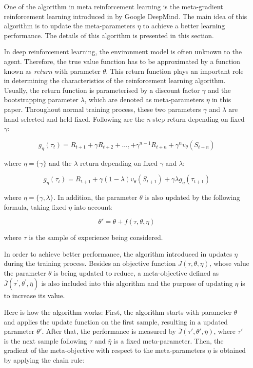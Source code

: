 One of the algorithm in meta reinforcement learning is the meta-gradient reinforcement learning introduced in \cite{meta-gradient} by Google DeepMind. The main idea of this algorithm is to update the meta-parameters $\eta$ to achieve a better learning performance. The details of this algorithm is presented in this section.

\par
In deep reinforcement learning, the environment model is often unknown to the agent. Therefore, the true value function has to be approximated by a function known as \textit{return} with parameter $\theta$. This return function plays an important role in determining the characteristics of the reinforcement learning algorithm. Usually, the return function is parameterised by a discount factor $\gamma$ and the bootstrapping parameter $\lambda$, which are denoted as meta-parameters $\eta$ in this paper. Throughout normal training process, these two parameters $\gamma$ and $\lambda$ are hand-selected and held fixed. Following are the \textit{n}-step return\cite{n-step-return} depending on fixed $\gamma$:

\[g_{\eta}\left(\tau_{t}\right)=R_{t+1}+\gamma R_{t+2}+\ldots,+\gamma^{n-1} R_{t+n}+\gamma^{n} v_{\theta}\left(S_{t+n}\right)\]

where $\eta = \{\gamma\}$ and the $\lambda$ return\cite{lambda-return} depending on fixed $\gamma$ and $\lambda$:

\[g_{\eta}\left(\tau_{t}\right)=R_{t+1}+\gamma(1-\lambda) v_{\theta}\left(S_{t+1}\right)+\gamma \lambda g_{\eta}\left(\tau_{t+1}\right)\]

where $\eta = \{\gamma, \lambda\}$. In addition, the parameter $\theta$ is also updated by the following formula, taking fixed $\eta$ into account:

\[\theta' = \theta + f(\tau, \theta, \eta)\]

where $\tau$ is the sample of experience being considered.

\par
In order to achieve better performance, the algorithm introduced in \cite{meta-gradient} updates $\eta$ during the training process. Besides an objective function $J(\tau, \theta, \eta)$, whose value the parameter $\theta$ is being updated to reduce, a meta-objective defined as $\bar{J}\left(\tau^{\prime}, \theta^{\prime}, \bar{\eta}\right)$ is also included into this algorithm and the purpose of updating $\eta$ is to increase its value.

\par
Here is how the algorithm works: First, the algorithm starts with parameter $\theta$ and applies the update function on the first sample, resulting in a updated parameter $\theta'$. After that, the performance is measured by $\bar{J}(\tau', \theta', \bar{\eta})$, where $\tau'$ is the next sample following $\tau$ and $\bar{\eta}$ is a fixed meta-parameter. Then, the gradient of the meta-objective with respect to the meta-parameters $\eta$ is obtained by applying the chain rule:


